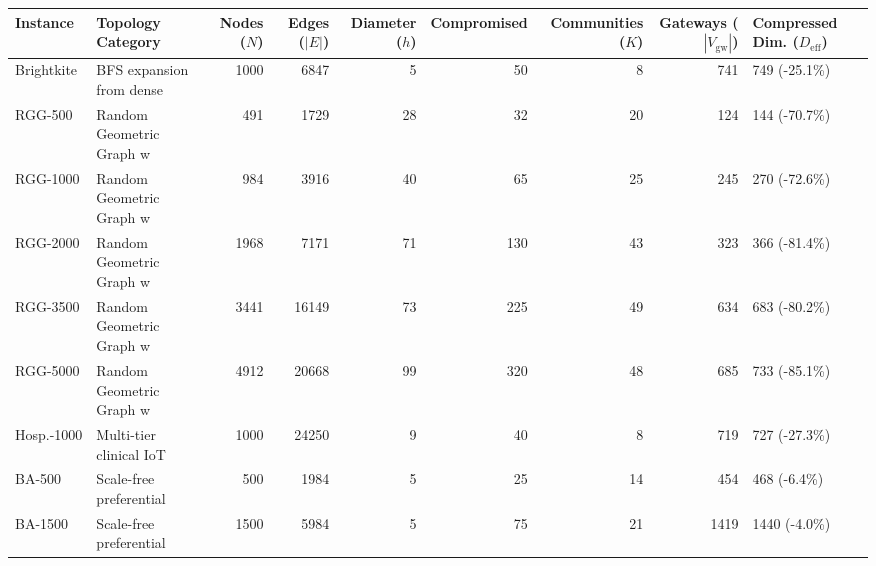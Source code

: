 \begin{tabular}{llrrrrrrl}
\toprule
Instance & Topology Category & Nodes ($N$) & Edges ($|E|$) & Diameter ($h$) & Compromised & Communities ($K$) & Gateways ($|V_{\mathrm{gw}}|$) & Compressed Dim. ($D_{\mathrm{eff}}$) \\
\midrule
Brightkite & BFS expansion from dense & 1000 & 6847 & 5 & 50 & 8 & 741 & 749 (-25.1\%) \\
RGG-500 & Random Geometric Graph w & 491 & 1729 & 28 & 32 & 20 & 124 & 144 (-70.7\%) \\
RGG-1000 & Random Geometric Graph w & 984 & 3916 & 40 & 65 & 25 & 245 & 270 (-72.6\%) \\
RGG-2000 & Random Geometric Graph w & 1968 & 7171 & 71 & 130 & 43 & 323 & 366 (-81.4\%) \\
RGG-3500 & Random Geometric Graph w & 3441 & 16149 & 73 & 225 & 49 & 634 & 683 (-80.2\%) \\
RGG-5000 & Random Geometric Graph w & 4912 & 20668 & 99 & 320 & 48 & 685 & 733 (-85.1\%) \\
Hosp.-1000 & Multi-tier clinical IoT  & 1000 & 24250 & 9 & 40 & 8 & 719 & 727 (-27.3\%) \\
BA-500 & Scale-free preferential  & 500 & 1984 & 5 & 25 & 14 & 454 & 468 (-6.4\%) \\
BA-1500 & Scale-free preferential  & 1500 & 5984 & 5 & 75 & 21 & 1419 & 1440 (-4.0\%) \\
\bottomrule
\end{tabular}
